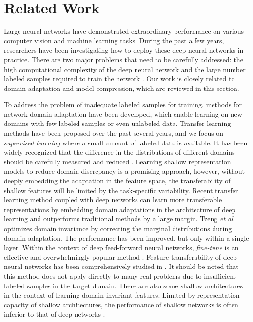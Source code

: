\documentclass[journal]{IEEEtran}
\newcommand{\etal}{\textit{et al}. }
\begin{document}
\section{Related Work}
\label{sec:related}
Large neural networks have demonstrated extraordinary performance on various computer vision and machine learning tasks. During the past a few years, researchers have been 
investigating how to deploy these deep neural networks in practice.
There are two major problems that need to be carefully addressed: the high computational complexity of the deep neural network and the large number labeled samples required to train the network \cite{kim2009configurable, sudha2011self}.  
Our work is closely related to domain adaptation and model compression, which are reviewed in this section.

To address  the problem of inadequate labeled samples for training, methods for network domain adaptation \cite{pan2010survey, wang2014flexible, long2015learning}
have been developed, which enable learning on new domains with few labeled samples or even unlabeled data. Transfer learning methods have been proposed over the past several years, and we focus on \textit{supervised learning} where a small amount of labeled data is available. It has been  widely recognized that the difference in the distributions of different domains should be carefully measured and reduced \cite{long2015learning}. Learning shallow representation models to reduce domain discrepancy is a promising approach, however, without deeply embedding the adaptation in the feature space, the transferability of shallow features will be limited by the task-specific variability. Recent transfer learning method coupled with deep networks can learn more transferable representations by embedding domain adaptations in the architecture of deep learning \cite{ganin2014unsupervised} and outperforms traditional methods by a large margin. Tzeng \etal \cite{tzeng2015simultaneous} optimizes domain invariance by correcting the marginal distributions during domain adaptation. The performance has been improved, but only within a single layer. Within the context of deep feed-forward neural networks, \textit{fine-tune} is an effective and overwhelmingly popular method \cite{zeiler2014visualizing, oquab2014learning}. Feature transferability of deep neural networks has been comprehensively studied in \cite{yosinski2014transferable}. It should be noted  that this method does not apply directly to many real problems due to insufficient labeled samples in the target domain. There are also some shallow architectures \cite{ajakan2014domain, ghifary2014domain} in the context of learning domain-invariant features. Limited by representation capacity of shallow architectures, the performance of shallow networks is often inferior to that 
of deep networks \cite{long2015learning}. 
\end{document}
